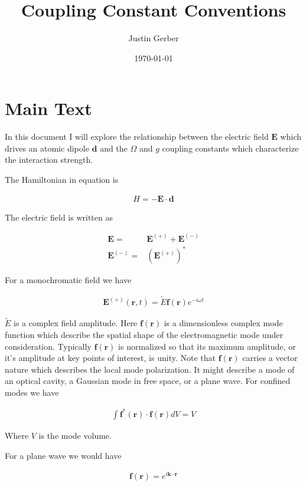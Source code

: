 \documentclass[12pt]{article}
\renewcommand{\vec}[1]{\boldsymbol{#1}}
\begin{document}
\title{Coupling Constant Conventions}
\author{Justin Gerber}
\date{\today}
\maketitle

\section{Main Text}

In this document I will explore the relationship between the electric field $\vec{E}$ which drives an atomic dipole $\vec{d}$ and the $\Omega$ and $g$ coupling constants which characterize the interaction strength.

The Hamiltonian in equation is

\begin{align}
H = -\vec{E}\cdot\vec{d}
\end{align}

The electric field is written as

\begin{align}
\vec{E} =& \vec{E}^{(+)} + \vec{E}^{(-)}\\
\vec{E}^{(-)} =& \left(\vec{E}^{(+)}\right)^*
\end{align}

For a monochromatic field we have

\begin{align}
\vec{E}^{(+)}(\vec{r}, t) = \tilde{E}\vec{f}(\vec{r}) e^{-i\omega t}
\end{align}

$\tilde{E}$ is a complex field amplitude.
Here $\vec{f}(\vec{r})$ is a dimensionless complex mode function which describe the spatial shape of the electromagnetic mode under consideration.
Typically $\vec{f}(\vec{r})$ is normalized so that its maximum amplitude, or it's amplitude at key points of interest, is unity.
Note that $\vec{f}(\vec{r})$ carries a vector nature which describes the local mode polarization.
It might describe a mode of an optical cavity, a Gaussian mode in free space, or a plane wave.
For confined modes we have

\begin{align}
\int \vec{f}^*(\vec{r})\cdot \vec{f}(\vec{r}) dV = V
\end{align}

Where $V$ is the mode volume.

For a plane wave we would have

\begin{align}
\vec{f}(\vec{r}) = e^{i\vec{k}\cdot\vec{r}}
\end{align}
\end{document}
